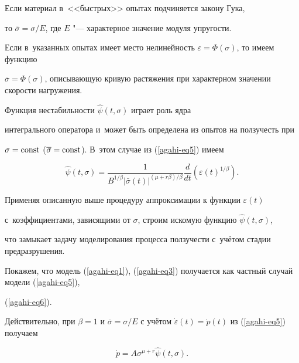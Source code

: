 Если материал в~<<быстрых>> опытах подчиняется закону Гука,

то $\overline \sigma ={\sigma }/{E}$, где  $E$ "--- характерное значение модуля упругости.

Если в~указанных опытах имеет место нелинейность $\varepsilon =\Phi (\sigma )$, то имеем функцию

$\overline \sigma =\Phi (\sigma )$, описывающую кривую растяжения при характерном значении скорости нагружения.



Функция нестабильности $\hat {\psi }(t,\sigma )$ играет роль ядра

интегрального оператора и~может быть определена из опытов на ползучесть при

$\sigma =\rm const$ ($\overline \sigma =\rm const$). В~этом случае из (\ref{agahi-eq5}) имеем

\begin{equation}

\label{agahi-eq6}

\hat {\psi }(t,\sigma )=\frac{1}{B^{1/\beta}\left| {\bar {\sigma }(t)}

\right|^{(\mu +r\beta )/\beta }}\frac{d}{dt}\left( {\varepsilon (t)^{1/\beta

}} \right).

\end{equation}

Применяя описанную выше процедуру аппроксимации к функции $\varepsilon (t)$

с~коэффициентами, зависящими от $\sigma $, строим искомую функцию $\hat {\psi }(t, \sigma )$,

что замыкает задачу моделирования процесса ползучести с~учётом стадии предразрушения.



Покажем, что модель (\ref{agahi-eq1}), (\ref{agahi-eq3}) получается как частный случай модели (\ref{agahi-eq5}),

(\ref{agahi-eq6}).

Действительно, при $\beta =1$ и $\overline \sigma ={\sigma }/{E}$  с учётом $\dot {\varepsilon }(t)=\dot {p}(t)$ из (\ref{agahi-eq5}) получаем

\begin{equation}

\label{agahi-eq7}

\dot {p}=A\sigma ^{\mu +r} \hat {\psi }(t, \sigma ).

\end{equation}

